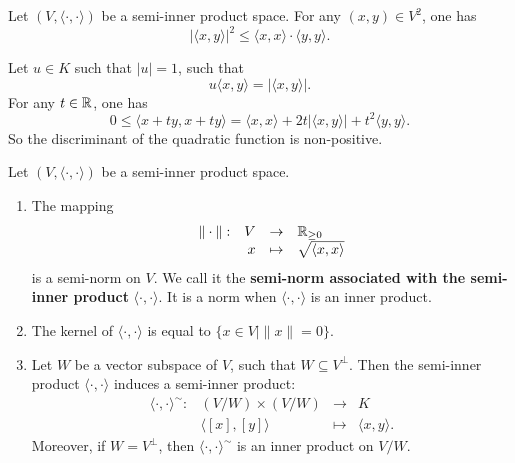\begin{theoremenv}
    Let $\left(V,\langle \cdot, \cdot \rangle\right)$ be a semi-inner product space.
    For any $(x,y)\in V^2$, one has 
    $$ \left| \langle x,y\rangle\right|^2 \le \langle x, x\rangle \cdot \langle y,y\rangle.$$
\end{theoremenv}
\begin{proofenv}
    Let $u\in K$ such that $|u|=1$, such that
    $$ u\langle x,y\rangle = \left|\langle x,y\rangle\right|.$$
    For any $t\in \mathbb{R}$, one has 
    $$ 0\le \langle x + ty, x+ty\rangle = \langle x,x\rangle + 2t \left| \langle x,y\rangle \right| + t^2\langle y,y\rangle.$$
    So the discriminant of the quadratic function is non-positive.
\end{proofenv}
\begin{propositionenv}
    Let $\left(V, \langle \cdot, \cdot\rangle\right)$ be a semi-inner product space.
    \begin{enumerate}
        \item The mapping $$\begin{array}{rrcl}
            \|\cdot\|: & V & \rightarrow &\mathbb{R}_{\ge 0}\\
            & x &\mapsto & \sqrt{\langle x,x \rangle}
        \end{array}$$
        is a semi-norm on $V$. We call it the \textbf{semi-norm associated with the semi-inner product} $\langle \cdot ,\cdot\rangle$.
        It is a norm when $\langle \cdot ,\cdot\rangle$ is an inner product.
        \item The kernel of $\langle \cdot ,\cdot\rangle$ is equal to $\{x\in V\mid \| x\| = 0\}.$
        \item Let $W$ be a vector subspace of $V$, such that $W\subseteq V^\perp$. Then the semi-inner product $\langle \cdot,\cdot\rangle$ induces a semi-inner product:
        $$\begin{array}{rrcl}
            \langle \cdot ,\cdot\rangle^\sim : & \left(V/W\right) \times \left(V/W\right) & \rightarrow & K\\
            & \langle [x], [y] \rangle & \mapsto & \langle x,y\rangle.
        \end{array}$$
        Moreover, if $W = V^\perp$, then $\langle \cdot, \cdot\rangle^\sim$ is an inner product on $V/W$.
    \end{enumerate}
\end{propositionenv}
